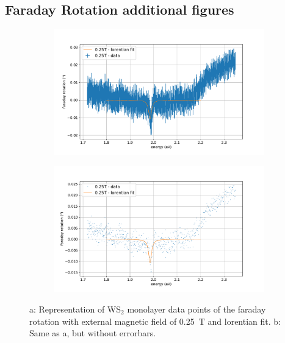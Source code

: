 \subsection{Faraday Rotation additional figures}
\label{sec:anhang:far}

\begin{figure}[!ht]
    \centering
    \begin{subfigure}{0.47\textwidth}
        \centering
        \includegraphics[width=1.0\textwidth]{plots/WS2_250mT.pdf}
    \caption{}
    \end{subfigure}
    \begin{subfigure}{0.47\textwidth}
        \centering
        \includegraphics[width=\textwidth]{plots/WS2_250mT_noerror.pdf}
        \caption{}
        \label{fig_WS2_250mT_noerror}
    \end{subfigure}
    \caption{a: Representation of WS$_2$ monolayer data points of the faraday rotation with external magnetic field of \SI{0.25}{\tesla} and lorentian fit. b: Same as a, but without errorbars.} %
\end{figure}


